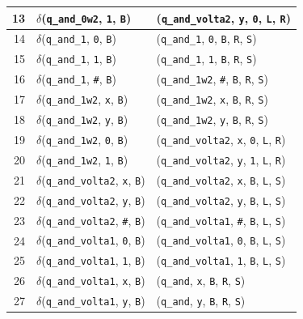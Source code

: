 \documentclass[report, 12pt]{uftreport}
\begin{document}
{\begin{longtable}{r l l}
13 & $\delta$(\texttt{q\_and\_0w2}, \texttt{1}, \texttt{B}) & (\texttt{q\_and\_volta2}, \texttt{y}, \texttt{0}, \texttt{L}, \texttt{R}) \\
\midrule
14 & $\delta$(\texttt{q\_and\_1}, \texttt{0}, \texttt{B}) & (\texttt{q\_and\_1}, \texttt{0}, \texttt{B}, \texttt{R}, \texttt{S}) \\
15 & $\delta$(\texttt{q\_and\_1}, \texttt{1}, \texttt{B}) & (\texttt{q\_and\_1}, \texttt{1}, \texttt{B}, \texttt{R}, \texttt{S}) \\
16 & $\delta$(\texttt{q\_and\_1}, \texttt{\#}, \texttt{B}) & (\texttt{q\_and\_1w2}, \texttt{\#}, \texttt{B}, \texttt{R}, \texttt{S}) \\
\midrule
17 & $\delta$(\texttt{q\_and\_1w2}, \texttt{x}, \texttt{B}) & (\texttt{q\_and\_1w2}, \texttt{x}, \texttt{B}, \texttt{R}, \texttt{S}) \\
18 & $\delta$(\texttt{q\_and\_1w2}, \texttt{y}, \texttt{B}) & (\texttt{q\_and\_1w2}, \texttt{y}, \texttt{B}, \texttt{R}, \texttt{S}) \\
19 & $\delta$(\texttt{q\_and\_1w2}, \texttt{0}, \texttt{B}) & (\texttt{q\_and\_volta2}, \texttt{x}, \texttt{0}, \texttt{L}, \texttt{R}) \\
20 & $\delta$(\texttt{q\_and\_1w2}, \texttt{1}, \texttt{B}) & (\texttt{q\_and\_volta2}, \texttt{y}, \texttt{1}, \texttt{L}, \texttt{R}) \\
\midrule
21 & $\delta$(\texttt{q\_and\_volta2}, \texttt{x}, \texttt{B}) & (\texttt{q\_and\_volta2}, \texttt{x}, \texttt{B}, \texttt{L}, \texttt{S}) \\
22 & $\delta$(\texttt{q\_and\_volta2}, \texttt{y}, \texttt{B}) & (\texttt{q\_and\_volta2}, \texttt{y}, \texttt{B}, \texttt{L}, \texttt{S}) \\
23 & $\delta$(\texttt{q\_and\_volta2}, \texttt{\#}, \texttt{B}) & (\texttt{q\_and\_volta1}, \texttt{\#}, \texttt{B}, \texttt{L}, \texttt{S}) \\
\midrule
24 & $\delta$(\texttt{q\_and\_volta1}, \texttt{0}, \texttt{B}) & (\texttt{q\_and\_volta1}, \texttt{0}, \texttt{B}, \texttt{L}, \texttt{S}) \\
25 & $\delta$(\texttt{q\_and\_volta1}, \texttt{1}, \texttt{B}) & (\texttt{q\_and\_volta1}, \texttt{1}, \texttt{B}, \texttt{L}, \texttt{S}) \\
26 & $\delta$(\texttt{q\_and\_volta1}, \texttt{x}, \texttt{B}) & (\texttt{q\_and}, \texttt{x}, \texttt{B}, \texttt{R}, \texttt{S}) \\
27 & $\delta$(\texttt{q\_and\_volta1}, \texttt{y}, \texttt{B}) & (\texttt{q\_and}, \texttt{y}, \texttt{B}, \texttt{R}, \texttt{S}) \\

\end{longtable}}
\end{document}
